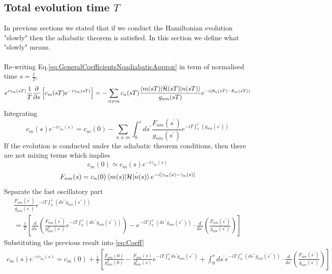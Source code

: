 \subsection{Total evolution time $T$}
In previous sections we stated that if we conduct the Hamiltonian evolution "slowly" then the adiabatic theorem is satisfied. In this section we define what "slowly" means. \\\\
Re-writing Eq.\ref{eq:GeneralCoefficientsNoadiabaticApprox} in term of normalised time $s = \frac{t}{T}$,
\begin{equation}
    e^{i\gamma_{m}(sT)}\frac{1}{T}\frac{\partial }{\partial s}\left[c_{m}(sT)e^{-i\gamma_{m}(sT)}\right] = -\sum_{n\neq m} c_{n}(sT) \frac{\braket{m(sT)|\dot{\mathcal{H}}(sT)|n(sT)}}{g_{nm}(sT)}e^{-i\left(\theta_{n}(sT) - \theta_{m}(sT)\right)}
\end{equation}
Integrating
\begin{equation}
\label{eq:Coeff}
    c_{m}(s)e^{-i\gamma_{m}(s)} = c_{m}(0) - \sum_{n\neq m}\int_{0}^{s} ds^{\prime}\frac{F_{nm}(s^{\prime})}{g_{nm}(s^{\prime})}e^{-iT\int_{0}^{s^{\prime}}\left(g_{nm}(s^{\prime})\right)}
\end{equation}
If the evolution is conducted under the adiabatic theorem conditions, then there are not mixing terms which implies
\begin{equation}
    c_{m}(0) \simeq c_{m}(s)e^{-i\gamma_{m}(s)}
\end{equation}
\begin{equation}
    F_{nm}(s) = c_{n}(0)\braket{m(s)|\dot{\mathcal{H}|n(s)}} e^{-i\left[\gamma_{m}(s) - \gamma_{n}(s)\right]}
\end{equation}
Separate the fast oscillatory part
\begin{align}
\frac{F_{nm}(s^{\prime})}{g_{nm}(s^{\prime})} e^{-iT\int_{0}^{s^{\prime}}\left(ds^{\prime \prime}g_{nm}(s^{\prime\prime}) \right)} \\
= \frac{i}{T}\left[\frac{d}{ds^{\prime}}\left(\frac{F_{nm}(s^{\prime})}{g^{2}_{nm}(s^{\prime})}e^{-iT\int_{0}^{s^{\prime}}\left(ds^{\prime \prime}g_{nm}(s^{\prime\prime}) \right)}\right) - e^{-iT\int_{0}^{s^{\prime}}\left(ds^{\prime \prime}g_{nm}(s^{\prime\prime}) \right)} \cdot \frac{d}{ds^{\prime}}\left(\frac{F_{nm}(s^{\prime})}{g_{nm}(s^{\prime})}\right)\right] 
 \end{align}
 Substituting the previous result into \ref{eq:Coeff}
 \begin{align}
     c_{m}(s)e^{-i\gamma_{m}(s)} = c_{m}(0) + \frac{i}{T}\left[\frac{F_{nm}(0)}{g^{2}_{nm}(0)} - \frac{F_{nm}(s)}{g^{2}_{nm}(s)}e^{-iT\int_{0}^{s}ds^{\prime}g_{nm}(s^{\prime \prime})} + \int_{0}^{s}ds^{\prime} e^{-iT\int_{0}^{s^{\prime}}\left(ds^{\prime \prime}g_{nm}(s^{\prime\prime}) \right)} \cdot \frac{d}{ds^{\prime}}\left(\frac{F_{nm}(s^{\prime})}{g_{nm}(s^{\prime})}\right)\right] 
 \end{align}
